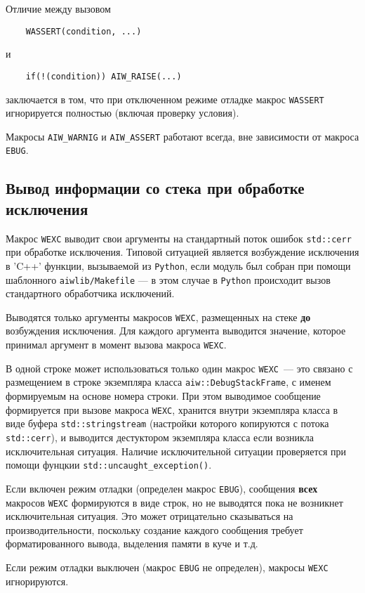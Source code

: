 Отличие между вызовом 
\begin{verbatim}
    WASSERT(condition, ...)
\end{verbatim}
и
\begin{verbatim}
    if(!(condition)) AIW_RAISE(...)
\end{verbatim}
заключается в том, что при отключенном режиме отладке макрос \verb'WASSERT' игнорируется полностью (включая проверку условия).

Макросы \verb'AIW_WARNIG' и \verb'AIW_ASSERT' работают всегда, вне зависимости от макроса \verb'EBUG'.

\subsection{Вывод информации со стека при обработке исключения}
Макрос \verb'WEXC' выводит свои аргументы на стандартный поток ошибок \verb'std::cerr' при обработке исключения.
Типовой ситуацией является возбуждение исключения в \veb'C++' функции, вызываемой из \verb'Python', если
модуль был собран при помощи шаблонного \verb'aiwlib/Makefile' --- в этом случае в \verb'Python' происходит
вызов стандартного обработчика исключений.

Выводятся только аргументы макросов \verb'WEXC', размещенных на стеке {\bf до} возбуждения исключения.
Для каждого аргумента выводится значение, которое принимал аргумент в момент вызова макроса \verb'WEXC'.

В одной строке может использоваться только один макрос \verb'WEXC'~--- это связано с размещением в строке
экземпляра класса \verb'aiw::DebugStackFrame', с именем формируемым на основе номера строки.
При этом выводимое сообщение формируется при вызове макроса \verb'WEXC', хранится внутри экземпляра класса в виде
буфера \verb'std::stringstream' (настройки которого копируются с потока \verb'std::cerr'),
и выводится дестуктором экземпляра класса если возникла исключительная ситуация.
Наличие исключительной ситуации проверяется при помощи фунцкии \verb'std::uncaught_exception()'.

Если включен режим отладки (определен макрос \verb'EBUG'), сообщения {\bf всех} макросов \verb'WEXC' формируются в виде строк,
но не выводятся пока не возникнет исключительная ситуация.
Это может отрицательно сказываться на производительности, поскольку создание каждого сообщения
требует форматированного вывода, выделения памяти в куче и т.д.

Если режим отладки выключен (макрос \verb'EBUG' не определен), макросы \verb'WEXC' игнорируются.


